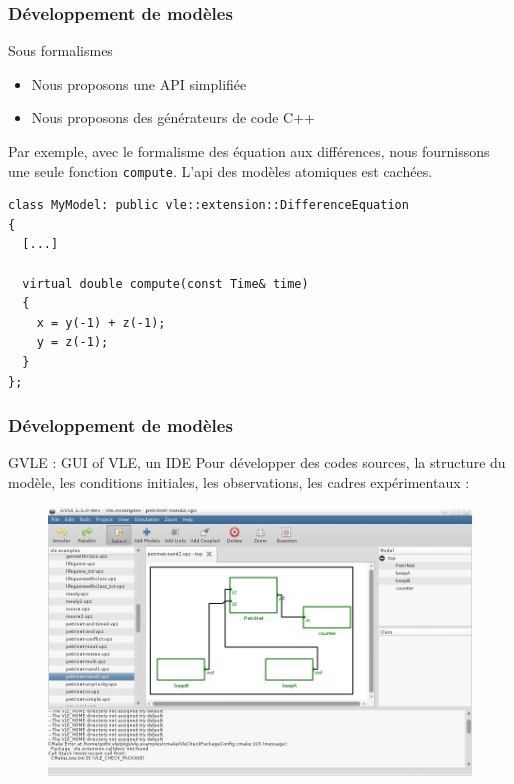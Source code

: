 \documentclass[xetex, compress, table, dvipsnames]{beamer}
\begin{document}
\begin{frame}[fragile]
  \frametitle{Développement de modèles}
  \begin{block}{Sous formalismes}
    \begin{itemize}
    \item Nous proposons une API simplifiée
    \item Nous proposons des générateurs de code C++
    \end{itemize}
  \end{block}
  \begin{exampleblock}{}
    Par exemple, avec le formalisme des équation aux différences, nous
    fournissons une seule fonction \texttt{compute}. L'api des modèles
    atomiques est cachées.
\begin{lstlisting}
class MyModel: public vle::extension::DifferenceEquation
{
  [...]

  virtual double compute(const Time& time)
  {
    x = y(-1) + z(-1);
    y = z(-1);
  }
};
\end{lstlisting}
  \end{exampleblock}
\end{frame}

\begin{frame}
  \frametitle{Développement de modèles}
  \begin{block}{GVLE : GUI of VLE, un IDE}
    Pour développer des codes sources, la structure du modèle, les
    conditions initiales, les observations, les cadres expérimentaux :
    \begin{figure}[htpb]
      \centering
      \includegraphics[width=.8\textwidth]{gvle}
    \end{figure}
  \end{block}
\end{frame}
\end{document}
